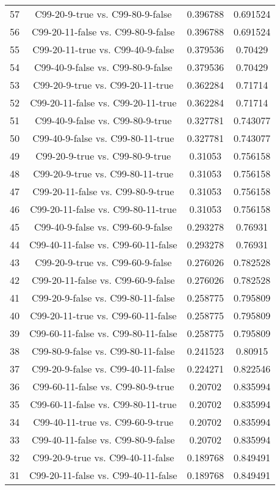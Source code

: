 \documentclass[a4paper,10pt]{article}
\begin{document}
\begin{landscape}
\begin{table}[!htp]
\begin{tabular}{cccc}
57&C99-20-9-true vs. C99-80-9-false&0.396788&0.691524\\
56&C99-20-11-false vs. C99-80-9-false&0.396788&0.691524\\
55&C99-20-11-true vs. C99-40-9-false&0.379536&0.70429\\
54&C99-40-9-false vs. C99-80-9-false&0.379536&0.70429\\
53&C99-20-9-true vs. C99-20-11-true&0.362284&0.71714\\
52&C99-20-11-false vs. C99-20-11-true&0.362284&0.71714\\
51&C99-40-9-false vs. C99-80-9-true&0.327781&0.743077\\
50&C99-40-9-false vs. C99-80-11-true&0.327781&0.743077\\
49&C99-20-9-true vs. C99-80-9-true&0.31053&0.756158\\
48&C99-20-9-true vs. C99-80-11-true&0.31053&0.756158\\
47&C99-20-11-false vs. C99-80-9-true&0.31053&0.756158\\
46&C99-20-11-false vs. C99-80-11-true&0.31053&0.756158\\
45&C99-40-9-false vs. C99-60-9-false&0.293278&0.76931\\
44&C99-40-11-false vs. C99-60-11-false&0.293278&0.76931\\
43&C99-20-9-true vs. C99-60-9-false&0.276026&0.782528\\
42&C99-20-11-false vs. C99-60-9-false&0.276026&0.782528\\
41&C99-20-9-false vs. C99-80-11-false&0.258775&0.795809\\
40&C99-20-11-true vs. C99-60-11-false&0.258775&0.795809\\
39&C99-60-11-false vs. C99-80-11-false&0.258775&0.795809\\
38&C99-80-9-false vs. C99-80-11-false&0.241523&0.80915\\
37&C99-20-9-false vs. C99-40-11-false&0.224271&0.822546\\
36&C99-60-11-false vs. C99-80-9-true&0.20702&0.835994\\
35&C99-60-11-false vs. C99-80-11-true&0.20702&0.835994\\
34&C99-40-11-true vs. C99-60-9-true&0.20702&0.835994\\
33&C99-40-11-false vs. C99-80-9-false&0.20702&0.835994\\
32&C99-20-9-true vs. C99-40-11-false&0.189768&0.849491\\
31&C99-20-11-false vs. C99-40-11-false&0.189768&0.849491\\

\end{tabular}
\end{table}
\end{landscape}
\end{document}
